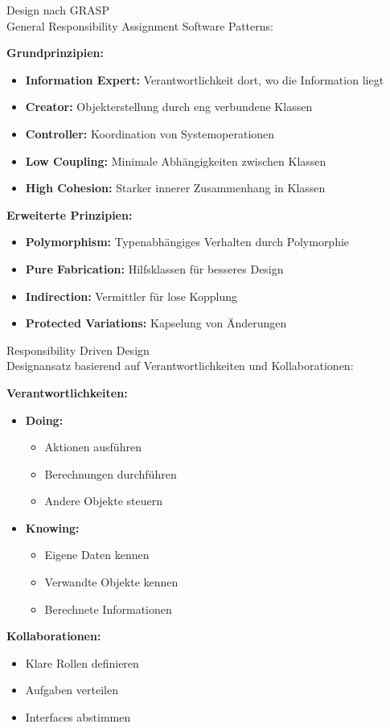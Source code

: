 \begin{concept}{Design nach GRASP}\\
General Responsibility Assignment Software Patterns:

\textbf{Grundprinzipien:}
\begin{itemize}
    \item \textbf{Information Expert:} Verantwortlichkeit dort, wo die Information liegt
    \item \textbf{Creator:} Objekterstellung durch eng verbundene Klassen
    \item \textbf{Controller:} Koordination von Systemoperationen
    \item \textbf{Low Coupling:} Minimale Abhängigkeiten zwischen Klassen
    \item \textbf{High Cohesion:} Starker innerer Zusammenhang in Klassen
\end{itemize}

\textbf{Erweiterte Prinzipien:}
\begin{itemize}
    \item \textbf{Polymorphism:} Typenabhängiges Verhalten durch Polymorphie
    \item \textbf{Pure Fabrication:} Hilfsklassen für besseres Design
    \item \textbf{Indirection:} Vermittler für lose Kopplung
    \item \textbf{Protected Variations:} Kapselung von Änderungen
\end{itemize}
\end{concept}

\begin{concept}{Responsibility Driven Design}\\
Designansatz basierend auf Verantwortlichkeiten und Kollaborationen:

\textbf{Verantwortlichkeiten:}
\begin{itemize}
    \item \textbf{Doing:}
    \begin{itemize}
        \item Aktionen ausführen
        \item Berechnungen durchführen
        \item Andere Objekte steuern
    \end{itemize}
    
    \item \textbf{Knowing:}
    \begin{itemize}
        \item Eigene Daten kennen
        \item Verwandte Objekte kennen
        \item Berechnete Informationen
    \end{itemize}
\end{itemize}

\textbf{Kollaborationen:}
\begin{itemize}
    \item Klare Rollen definieren
    \item Aufgaben verteilen
    \item Interfaces abstimmen
\end{itemize}
\end{concept}

